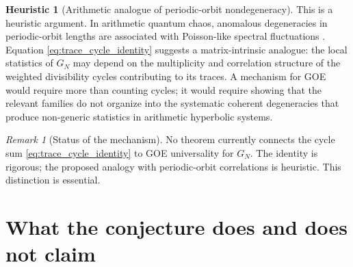 \documentclass[11pt]{amsart}
\numberwithin{equation}{section}
\theoremstyle{plain}
\theoremstyle{definition}
\newtheorem{heuristic}[theorem]{Heuristic}
\theoremstyle{remark}
\newtheorem{remark}[theorem]{Remark}
\begin{document}
\begin{heuristic}[Arithmetic analogue of periodic-orbit nondegeneracy]
\label{heur:cycle_nondegeneracy}
This is a heuristic argument.  In arithmetic quantum chaos, anomalous degeneracies in periodic-orbit lengths are associated with Poisson-like spectral fluctuations \cite{BogomolnyEtAl1992,LuoSarnak1994}.  Equation \eqref{eq:trace_cycle_identity} suggests a matrix-intrinsic analogue: the local statistics of $G_N$ may depend on the multiplicity and correlation structure of the weighted divisibility cycles contributing to its traces.  A mechanism for GOE would require more than counting cycles; it would require showing that the relevant families do not organize into the systematic coherent degeneracies that produce non-generic statistics in arithmetic hyperbolic systems.
\end{heuristic}

\begin{remark}[Status of the mechanism]
\label{rem:cycle_mechanism_status}
No theorem currently connects the cycle sum \eqref{eq:trace_cycle_identity} to GOE universality for $G_N$.  The identity is rigorous; the proposed analogy with periodic-orbit correlations is heuristic.  This distinction is essential.
\end{remark}

\section{What the conjecture does and does not claim}
\label{sec:scope}
\end{document}
